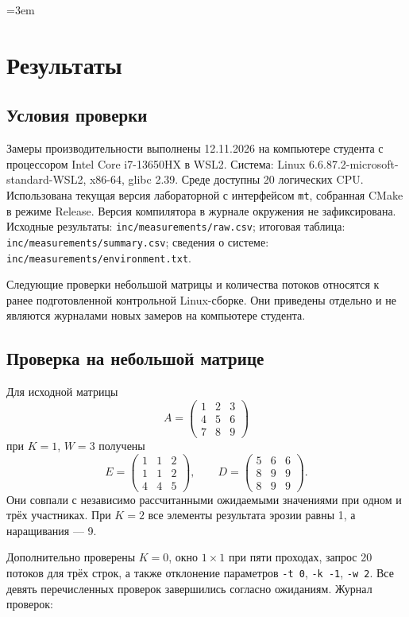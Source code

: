 \begingroup
\emergencystretch=3em
\section{Результаты}
\subsection{Условия проверки}
Замеры производительности выполнены 12.11.2026 на компьютере студента
с процессором Intel Core i7-13650HX в WSL2.
Система: Linux 6.6.87.2-microsoft-standard-WSL2, x86-64, glibc 2.39.
Среде доступны 20 логических CPU. Использована текущая версия лабораторной
с интерфейсом \texttt{mt}, собранная CMake в режиме Release.
Версия компилятора в журнале окружения не зафиксирована.
Исходные результаты: \texttt{inc/measurements/raw.csv};
итоговая таблица: \texttt{inc/measurements/summary.csv};
сведения о системе: \texttt{inc/measurements/environment.txt}.

Следующие проверки небольшой матрицы и количества потоков относятся
к ранее подготовленной контрольной Linux-сборке. Они приведены отдельно
и не являются журналами новых замеров на компьютере студента.

\subsection{Проверка на небольшой матрице}
Для исходной матрицы
\[
A=\begin{pmatrix}1&2&3\\4&5&6\\7&8&9\end{pmatrix}
\]
при \(K=1\), \(W=3\) получены
\[
E=\begin{pmatrix}1&1&2\\1&1&2\\4&4&5\end{pmatrix},\qquad
D=\begin{pmatrix}5&6&6\\8&9&9\\8&9&9\end{pmatrix}.
\]
Они совпали с независимо рассчитанными ожидаемыми значениями
при одном и трёх участниках. При \(K=2\) все элементы результата
эрозии равны 1, а наращивания --- 9.

Дополнительно проверены \(K=0\), окно \(1\times1\) при пяти проходах,
запрос 20 потоков для трёх строк, а также отклонение параметров
\texttt{-t 0}, \texttt{-k -1}, \texttt{-w 2}.
Все девять перечисленных проверок завершились согласно ожиданиям.
Журнал проверок:


